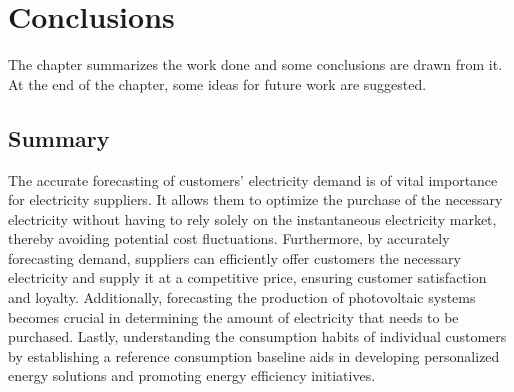 \chapter{Conclusions}
\label{cha:conclusions}
\vspace{0.4 cm}



The chapter summarizes the work done and some conclusions are drawn from it.
At the end of the chapter, some ideas for future work are suggested.


\section{Summary}
\label{sec:summary}
\vspace{0.2 cm}


The accurate forecasting of customers’ electricity demand is of vital importance for electricity suppliers.
It allows them to optimize the purchase of the necessary electricity without having to rely solely on the instantaneous electricity market, thereby avoiding potential cost fluctuations.
Furthermore, by accurately forecasting demand, suppliers can efficiently offer customers the necessary electricity and supply it at a competitive price, ensuring customer satisfaction and loyalty.
Additionally, forecasting the production of photovoltaic systems becomes crucial in determining the amount of electricity that needs to be purchased.
Lastly, understanding the consumption habits of individual customers by establishing a reference consumption baseline aids in developing personalized energy solutions and promoting energy efficiency initiatives.

